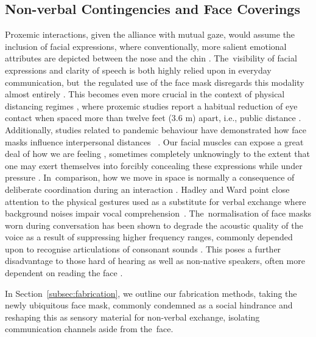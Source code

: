 \subsection*{Non-verbal Contingencies and Face Coverings}
\label{subsev:face_coverings}

Proxemic interactions, given the alliance with mutual gaze, would assume the inclusion of facial expressions, where conventionally, more salient emotional attributes are depicted between the nose and the chin \citep{fischer_veiled_2012,blais_eyes_2012}. The~visibility of facial expressions and clarity of speech is both highly relied upon in everyday communication, but~the regulated use of the face mask disregards this modality almost entirely \citep{carbon_wearing_2020}. This becomes even more crucial in the context of physical distancing regimes \citep{campagne_problem_2021}, where proxemic studies report a habitual reduction of eye contact when spaced more than twelve feet (3.6 m) apart, i.e.,
public distance \citep{baldassare_cultural_1975}. Additionally, studies related to pandemic behaviour have demonstrated how face masks influence interpersonal distances %
~\cite{cartaud_wearing_2020}.
Our facial muscles can expose a great deal of how we are feeling \citep{qian_effects_2018,todorov_face_2017}, sometimes completely unknowingly to the extent that one may exert themselves into forcibly concealing these expressions while under pressure \citep{billings_challenge_2002}. In~comparison, how we move in space is normally a consequence of deliberate coordination during an interaction \citep{poyatos_interactive_1980,jones_communication_2016}. Hadley and Ward \cite{hadley_synchrony_2021} point close attention to the physical gestures used as a substitute for verbal exchange where background noises impair vocal comprehension~\cite{hadley_synchrony_2021}. The~normalisation of face masks worn during conversation has been shown to degrade the acoustic quality of the voice as a result of suppressing higher frequency ranges, commonly depended upon to recognise articulations of consonant sounds \citep{saunders_impacts_2021,rahne_influence_2021,nobrega_how_2020}. This poses a further disadvantage to those hard of hearing \citep{mckee_overcoming_2020} as well as non-native speakers, often more dependent on reading the face \citep{inceoglu_language_2021,jabber_non-verbal_2020}.

In Section~\ref{subsec:fabrication}, we outline our fabrication methods, taking the newly ubiquitous face mask, commonly condemned as a social hindrance and reshaping this as sensory material for non-verbal exchange, isolating communication channels aside from the~face.

